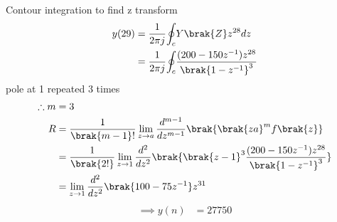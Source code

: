 \documentclass[journal,12pt,twocolumn]{IEEEtran}
\theoremstyle{remark}
\begin{document}
Contour integration to find z transform
\begin{align}
y(29)&=\frac{1}{2{\pi}j}{\oint_c}Y\brak{Z}z^{28}dz\\
&=\frac{1}{2{\pi}j}{\oint_c}{\frac{(200-150z^{-1})z^{28}}{\brak{1-z^{-1}}^{3}}}
\end{align}
pole at 1 repeated 3 times
\begin{align}
\therefore m&=3\\
R&=\frac{1}{\brak{m-1}!}\lim_{z\to a}\frac{d^{m-1}}{dz^{m-1}}\brak{\brak{z
a}^mf{\brak{z}}}\\
&=\frac{1}{\brak{2!}}\lim_{z\to 1}\frac{d^2}{dz^2}\brak{\brak{z-1}^{3}\frac{(200-150z^{-1})z^{28}}{\brak{1-z^{-1}}^3}}\\
&=\lim_{z\to1}\frac{d^2}{dz^2}\brak{100-75z^{-1}}z^{31}
\end{align}
\begin{align}
\implies y(n)&=27750
\end{align}


\end{document}
